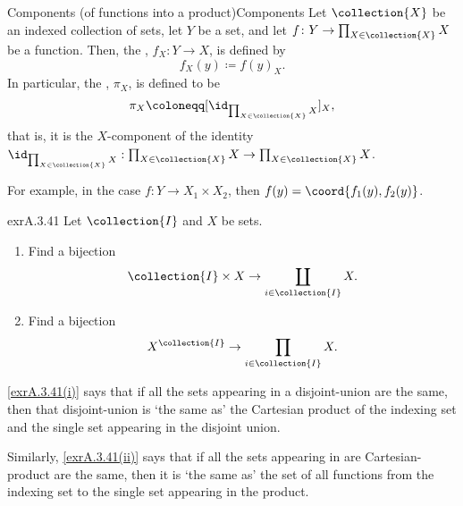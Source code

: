 \begin{dfn}{Components (of functions into a product)}{Components}
Let $\collection{X}$ be an indexed collection of sets, let $Y$ be a set, and let $f\colon Y\rightarrow \prod _{X\in \collection{X}}X$ be a function.  Then, the , $f_X:Y\rightarrow X$, is defined by
\begin{equation}
f_X(y)\coloneqq f(y)_X.
\end{equation}
In particular, the , $\pi _X$, is defined to be
\begin{equation}
\pi _X\coloneqq [\id _{\prod _{X\in \collection{X}}X}]_X,
\end{equation}
that is, it is the $X$-component of the identity $\id _{\prod _{X\in \collection{X}}X}:\prod _{X\in \collection{X}}X\rightarrow \prod _{X\in \collection{X}}X$.
\begin{rmk}
For example, in the case $f\colon Y\rightarrow X_1\times X_2$, then $f(y)=\coord{f_1(y),f_2(y)}$.
\end{rmk}
\end{dfn}
\begin{exr}{}{exrA.3.41}
Let $\collection{I}$ and $X$ be sets.
\begin{enumerate}
\item \label{exrA.3.41(i)}Find a bijection
\begin{equation}
\collection{I}\times X\rightarrow \coprod _{i\in \collection{I}}X.
\end{equation}
\item \label{exrA.3.41(ii)}Find a bijection
\begin{equation}
X^{\collection{I}}\rightarrow \prod _{i\in \collection{I}}X.
\end{equation}
\end{enumerate}
\begin{rmk}
\cref{exrA.3.41(i)} says that if all the sets appearing in a disjoint-union are the same, then that disjoint-union is `the same as' the Cartesian product of the indexing set and the single set appearing in the disjoint union.
	
Similarly, \cref{exrA.3.41(ii)} says that if all the sets appearing in are Cartesian-product are the same, then it is `the same as' the set of all functions from the indexing set to the single set appearing in the product.
\end{rmk}
\end{exr}

